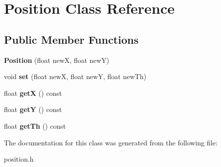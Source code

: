 \hypertarget{class_position}{}\section{Position Class Reference}
\label{class_position}
\subsection*{Public Member Functions}
\begin{DoxyCompactItemize}
\item 
\mbox{\label{class_position_a7890347396c66f6f1eddefce07382abc}} 
{\bfseries Position} (float newX, float newY)
\item 
\mbox{\label{class_position_a9c48a9e0efd9db741fd7de5c050b3cc0}} 
void {\bfseries set} (float newX, float newY, float new\+Th)
\item 
\mbox{\label{class_position_a252efaf275c7276a6f35338d198de7ee}} 
float {\bfseries getX} () const
\item 
\mbox{\label{class_position_a53ad8ec2f8383db4d615b3fc4e888f77}} 
float {\bfseries getY} () const
\item 
\mbox{\label{class_position_a2f4eb1b527496eb1175b0545418996e0}} 
float {\bfseries get\+Th} () const
\end{DoxyCompactItemize}


The documentation for this class was generated from the following file\+:\begin{DoxyCompactItemize}
\item 
position.\+h\end{DoxyCompactItemize}
